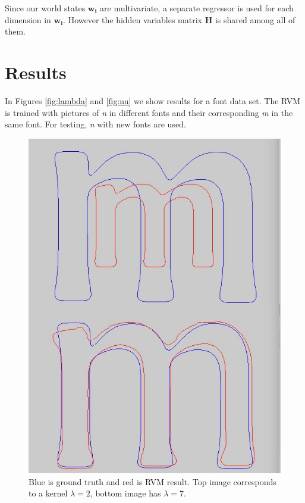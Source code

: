 \documentclass[12pt]{article}
\begin{document}
Since our world states $\mathbf{w_i}$ are multivariate, a separate regressor is used for each dimension in  $\mathbf{w_i}$.
However the hidden variables matrix $\mathbf{H}$ is shared among all of them.

\section{Results}

In Figures \ref{fig:lambda} and \ref{fig:nu} we show results for a font data set.
The RVM is trained with pictures of \emph{n} in different fonts and their corresponding \emph{m} in the same font.
For testing, \emph{n} with new fonts are used.

\begin{figure}[h]
	\centering
	\begin{minipage}[t]{.45\textwidth}
		\centering
		\includegraphics[scale=0.25]{images/lambda2_7}
		\caption{Blue is ground truth and red is RVM result. Top image corresponds to a kernel $\lambda=2$, bottom image has $\lambda=7$.}

\end{minipage}
\end{figure}
\end{document}
